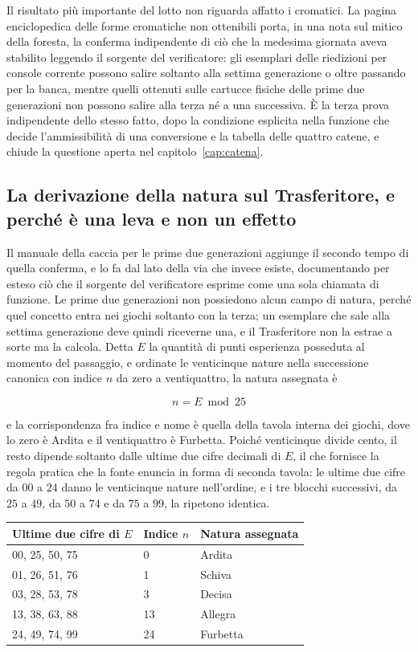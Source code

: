 Il risultato più importante del lotto non riguarda affatto i cromatici. La pagina enciclopedica delle forme cromatiche non ottenibili porta, in una nota sul mitico della foresta, la conferma indipendente di ciò che la medesima giornata aveva stabilito leggendo il sorgente del verificatore: gli esemplari delle riedizioni per console corrente possono salire soltanto alla settima generazione o oltre passando per la banca, mentre quelli ottenuti sulle cartucce fisiche delle prime due generazioni non possono salire alla terza né a una successiva. È la terza prova indipendente dello stesso fatto, dopo la condizione esplicita nella funzione che decide l'ammissibilità di una conversione e la tabella delle quattro catene, e chiude la questione aperta nel capitolo~\ref{cap:catena}.

\subsection{La derivazione della natura sul Trasferitore, e perché è una leva e non un effetto}

Il manuale della caccia per le prime due generazioni aggiunge il secondo tempo di quella conferma, e lo fa dal lato della via che invece esiste, documentando per esteso ciò che il sorgente del verificatore esprime come una sola chiamata di funzione. Le prime due generazioni non possiedono alcun campo di natura, perché quel concetto entra nei giochi soltanto con la terza; un esemplare che sale alla settima generazione deve quindi riceverne una, e il Trasferitore non la estrae a sorte ma la calcola. Detta $E$ la quantità di punti esperienza posseduta al momento del passaggio, e ordinate le venticinque nature nella successione canonica con indice $n$ da zero a ventiquattro, la natura assegnata è

\[ n = E \bmod 25 \]

e la corrispondenza fra indice e nome è quella della tavola interna dei giochi, dove lo zero è Ardita e il ventiquattro è Furbetta. Poiché venticinque divide cento, il resto dipende soltanto dalle ultime due cifre decimali di $E$, il che fornisce la regola pratica che la fonte enuncia in forma di seconda tavola: le ultime due cifre da $00$ a $24$ danno le venticinque nature nell'ordine, e i tre blocchi successivi, da $25$ a $49$, da $50$ a $74$ e da $75$ a $99$, la ripetono identica.

\begin{center}
\begin{tabular}{lll}
\hline
Ultime due cifre di $E$ & Indice $n$ & Natura assegnata \\
\hline
00, 25, 50, 75 & 0 & Ardita \\
01, 26, 51, 76 & 1 & Schiva \\
03, 28, 53, 78 & 3 & Decisa \\
13, 38, 63, 88 & 13 & Allegra \\
24, 49, 74, 99 & 24 & Furbetta \\
\hline
\end{tabular}
\end{center}

